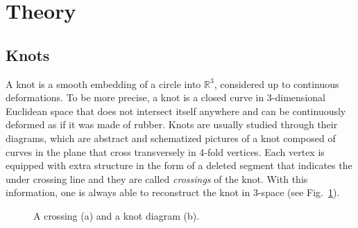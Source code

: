 % 
% 
% 
% 

\section{\label{sec:theory}Theory}
\subsection{\label{sec:theory:knots}Knots}
A knot is a smooth embedding of a circle into $\mathbb{R}^3$, considered up to continuous deformations. To be more precise, a knot is a closed curve in 3-dimensional Euclidean space that does not intersect itself anywhere and can be continuously deformed as if it was made of rubber\cite{Adams}.  Knots are usually studied through their diagrams, which are abstract and schematized pictures of a knot composed of curves in the plane that cross transversely in 4-fold vertices. Each vertex is equipped with extra structure in the form of a deleted segment that indicates the under crossing line and they are called {\it crossings} of the knot. With this information, one is always able to reconstruct the knot in 3-space (see Fig.~\ref{fig:knotdiag}).
\begin{figure}[h]
\centering
{}\hspace{3cm}
\caption{A crossing (a) and a knot diagram (b).}\label{fig:knotdiag}
\end{figure}


